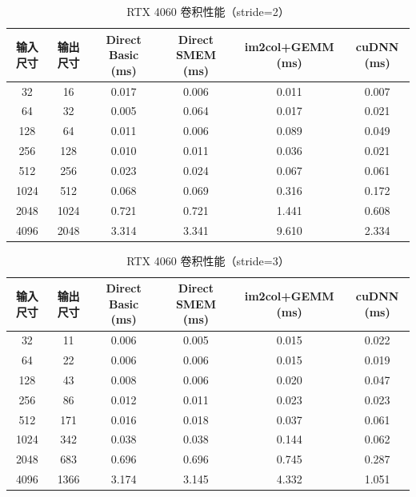 \documentclass[a4paper]{article}
\begin{document}
\begin{table}[H]
    \centering
    \small
    \caption{RTX 4060 卷积性能（stride=2）}
    \begin{tabular}{cccccc}
        \toprule
        \textbf{输入尺寸} & \textbf{输出尺寸} & \textbf{Direct Basic (ms)} & \textbf{Direct SMEM (ms)} & \textbf{im2col+GEMM (ms)} & \textbf{cuDNN (ms)} \\
        \midrule
        32    & 16    & 0.017 & 0.006 & 0.011 & 0.007 \\
        64    & 32    & 0.005 & 0.064 & 0.017 & 0.021 \\
        128   & 64    & 0.011 & 0.006 & 0.089 & 0.049 \\
        256   & 128   & 0.010 & 0.011 & 0.036 & 0.021 \\
        512   & 256   & 0.023 & 0.024 & 0.067 & 0.061 \\
        1024  & 512   & 0.068 & 0.069 & 0.316 & 0.172 \\
        2048  & 1024  & 0.721 & 0.721 & 1.441 & 0.608 \\
        4096  & 2048  & 3.314 & 3.341 & 9.610 & 2.334 \\
        \bottomrule
    \end{tabular}
\end{table}

\begin{table}[H]
    \centering
    \small
    \caption{RTX 4060 卷积性能（stride=3）}
    \begin{tabular}{cccccc}
        \toprule
        \textbf{输入尺寸} & \textbf{输出尺寸} & \textbf{Direct Basic (ms)} & \textbf{Direct SMEM (ms)} & \textbf{im2col+GEMM (ms)} & \textbf{cuDNN (ms)} \\
        \midrule
        32    & 11    & 0.006 & 0.005 & 0.015 & 0.022 \\
        64    & 22    & 0.006 & 0.006 & 0.015 & 0.019 \\
        128   & 43    & 0.008 & 0.006 & 0.020 & 0.047 \\
        256   & 86    & 0.012 & 0.011 & 0.023 & 0.023 \\
        512   & 171   & 0.016 & 0.018 & 0.037 & 0.061 \\
        1024  & 342   & 0.038 & 0.038 & 0.144 & 0.062 \\
        2048  & 683   & 0.696 & 0.696 & 0.745 & 0.287 \\
        4096  & 1366  & 3.174 & 3.145 & 4.332 & 1.051 \\
        \bottomrule
    \end{tabular}
\end{table}
\end{document}
